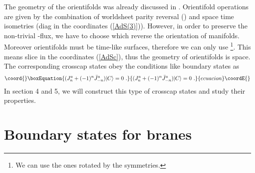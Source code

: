 \documentclass[a4paper,12pt]{article}
\providecommand{\bz}{\mathbb Z}
\providecommand{\ket}[1]{{|#1\rangle}{}}
\begin{document}
The geometry of the orientifolds was already discussed in \cite{oplane3}.
Orientifold operations are given by the combination of worldsheet
parity reversal (\myHighlight{$\Omega : \sigma \to 2 \pi - \sigma$}\coordHE{}) and space
time \myHighlight{$\bz_2$}\coordHE{} isometries (\coordHE{}diag\coordHE{} in the
coordinates (\ref{AdS(3)})).
However, in order to preserve the non-trivial \coordHE{}-flux, we have to choose
\coordHE{} which reverse the orientation of manifolds.
Moreover orientifolds must be time-like surfaces,
therefore we can only use \coordHE{}\footnote{
We can use the ones rotated by the symmetries. 
}.
This means \coordHE{} slice in the coordinates (\ref{AdSc}), 
thus the geometry of orientifolds is \coordHE{} space. 
The corresponding crosscap states obey the conditions like boundary states as
\begin{equation}\coord{}\boxEquation{
 (J^a_n + (-1)^n \bar{J}^a_{-n}) \ket{C} = 0 ~.
\label{CS}
}{
 (J^a_n + (-1)^n \bar{J}^a_{-n}) \ket{C} = 0 ~.
}{ecuacion}\coordE{}\end{equation}
In section 4 and 5, we will construct this type of crosscap states and
study their properties. 


\section{Boundary states for \coordHE{} branes}
\indent
\end{document}
